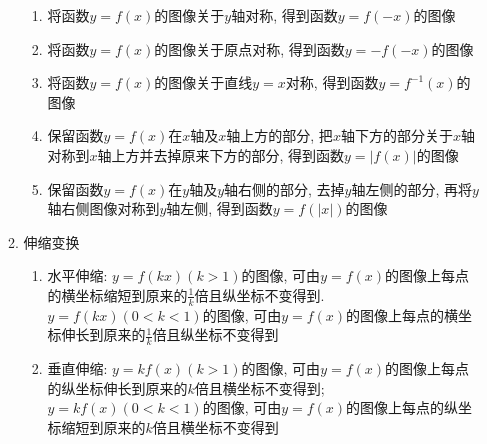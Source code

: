 \begin{enumerate}
\begin{enumerate}
\begin{enumerate}
                        \item 将函数$ y=f(x) $的图像关于$ y $轴对称, 得到函数$ y=f(-x) $的图像
                        \item 将函数$ y=f(x) $的图像关于原点对称, 得到函数$ y=-f(-x) $的图像
                        \item 将函数$ y=f(x) $的图像关于直线$ y=x $对称, 得到函数$ y=f^{-1}(x) $的图像
                        \item 保留函数$ y=f(x) $在$ x $轴及$ x $轴上方的部分, 把$ x $轴下方的部分关于$ x $轴对称到$ x $轴上方并去掉原来下方的部分, 得到函数$ y=|f(x)| $的图像
                        \item 保留函数$ y=f(x) $在$ y $轴及$ y $轴右侧的部分, 去掉$ y $轴左侧的部分, 再将$ y $轴右侧图像对称到$ y $轴左侧, 得到函数$ y=f(|x|) $的图像
                    \end{enumerate}
              \item 伸缩变换
                    \begin{enumerate}
                        \item 水平伸缩: $ y=f(kx)(k>1) $的图像, 可由$ y=f(x) $的图像上每点的横坐标缩短到原来的$ \frac{1}{k} $倍且纵坐标不变得到. $ y=f(kx)(0<k<1) $的图像, 可由$ y=f(x) $的图像上每点的横坐标伸长到原来的$ \frac{1}{k} $倍且纵坐标不变得到
                        \item 垂直伸缩: $ y=kf(x)(k>1) $的图像, 可由$ y=f(x) $的图像上每点的纵坐标伸长到原来的$ k $倍且横坐标不变得到; $ y=kf(x)(0<k<1) $的图像, 可由$ y=f(x) $的图像上每点的纵坐标缩短到原来的$ k $倍且横坐标不变得到
                    \end{enumerate}
          \end{enumerate}
\end{enumerate}
